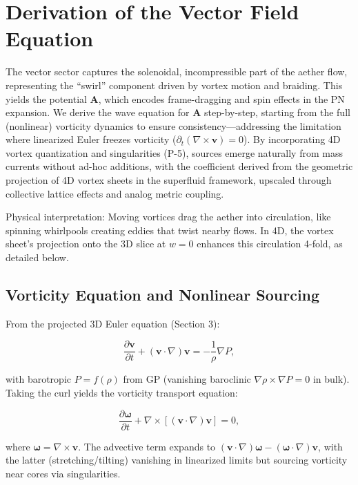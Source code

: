 \documentclass{article}
\begin{document}
\section{Derivation of the Vector Field Equation}

The vector sector captures the solenoidal, incompressible part of the aether flow, representing the ``swirl'' component driven by vortex motion and braiding. This yields the potential $\mathbf{A}$, which encodes frame-dragging and spin effects in the PN expansion. We derive the wave equation for $\mathbf{A}$ step-by-step, starting from the full (nonlinear) vorticity dynamics to ensure consistency---addressing the limitation where linearized Euler freezes vorticity ($\partial_t (\nabla \times \mathbf{v}) = 0$). By incorporating 4D vortex quantization and singularities (P-5), sources emerge naturally from mass currents without ad-hoc additions, with the coefficient derived from the geometric projection of 4D vortex sheets in the superfluid framework, upscaled through collective lattice effects and analog metric coupling.

Physical interpretation: Moving vortices drag the aether into circulation, like spinning whirlpools creating eddies that twist nearby flows. In 4D, the vortex sheet's projection onto the 3D slice at $w=0$ enhances this circulation 4-fold, as detailed below.

\subsection{Vorticity Equation and Nonlinear Sourcing}

From the projected 3D Euler equation (Section 3):

\[
\frac{\partial \mathbf{v}}{\partial t} + (\mathbf{v} \cdot \nabla) \mathbf{v} = -\frac{1}{\rho} \nabla P,
\]

with barotropic $P = f(\rho)$ from GP (vanishing baroclinic $\nabla \rho \times \nabla P = 0$ in bulk). Taking the curl yields the vorticity transport equation:

\[
\frac{\partial \boldsymbol{\omega}}{\partial t} + \nabla \times [(\mathbf{v} \cdot \nabla) \mathbf{v}] = 0,
\]

where $\boldsymbol{\omega} = \nabla \times \mathbf{v}$. The advective term expands to $(\mathbf{v} \cdot \nabla) \boldsymbol{\omega} - (\boldsymbol{\omega} \cdot \nabla) \mathbf{v}$, with the latter (stretching/tilting) vanishing in linearized limits but sourcing vorticity near cores via singularities.
\end{document}
